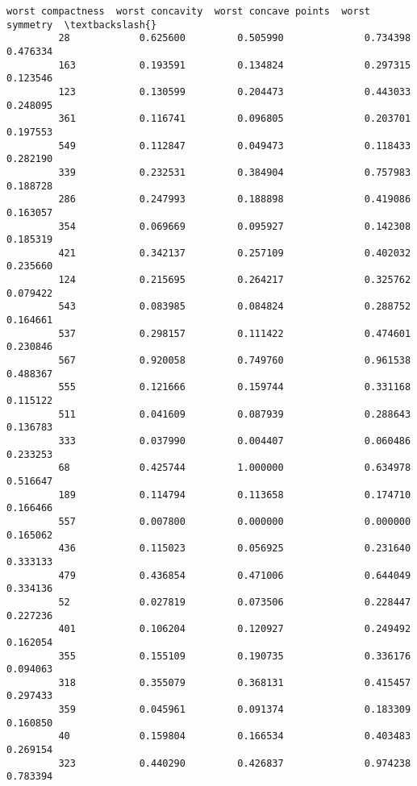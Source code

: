 \documentclass[11pt]{article}
\begin{document}
\begin{Verbatim}[commandchars=\\\{\}]
              worst compactness  worst concavity  worst concave points  worst symmetry  \textbackslash{}
         28            0.625600         0.505990              0.734398        0.476334   
         163           0.193591         0.134824              0.297315        0.123546   
         123           0.130599         0.204473              0.443033        0.248095   
         361           0.116741         0.096805              0.203701        0.197553   
         549           0.112847         0.049473              0.118433        0.282190   
         339           0.232531         0.384904              0.757983        0.188728   
         286           0.247993         0.188898              0.419086        0.163057   
         354           0.069669         0.095927              0.142308        0.185319   
         421           0.342137         0.257109              0.402032        0.235660   
         124           0.215695         0.264217              0.325762        0.079422   
         543           0.083985         0.084824              0.288752        0.164661   
         537           0.298157         0.111422              0.474601        0.230846   
         567           0.920058         0.749760              0.961538        0.488367   
         555           0.121666         0.159744              0.331168        0.115122   
         511           0.041609         0.087939              0.288643        0.136783   
         333           0.037990         0.004407              0.060486        0.233253   
         68            0.425744         1.000000              0.634978        0.516647   
         189           0.114794         0.113658              0.174710        0.166466   
         557           0.007800         0.000000              0.000000        0.165062   
         436           0.115023         0.056925              0.231640        0.333133   
         479           0.436854         0.471006              0.644049        0.334136   
         52            0.027819         0.073506              0.228447        0.227236   
         401           0.106204         0.120927              0.249492        0.162054   
         355           0.155109         0.190735              0.336176        0.094063   
         318           0.355079         0.368131              0.415457        0.297433   
         359           0.045961         0.091374              0.183309        0.160850   
         40            0.159804         0.166534              0.403483        0.269154   
         323           0.440290         0.426837              0.974238        0.783394   

\end{Verbatim}
\end{document}

